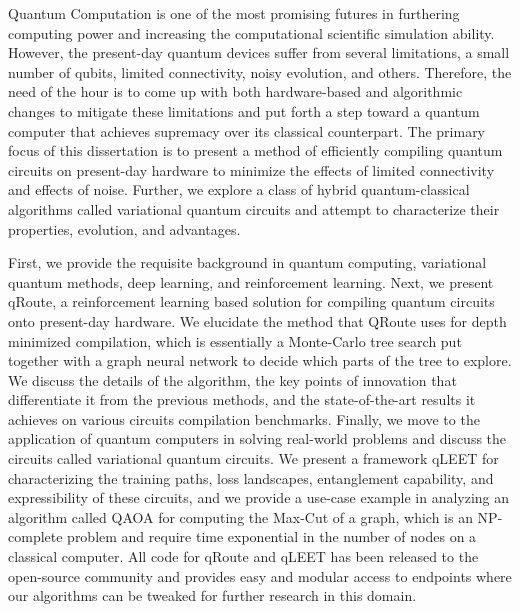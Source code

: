 Quantum Computation is one of the most promising futures in furthering computing power and increasing the computational scientific simulation ability. However, the present-day quantum devices suffer from several limitations, a small number of qubits, limited connectivity, noisy evolution, and others. Therefore, the need of the hour is to come up with both hardware-based and algorithmic changes to mitigate these limitations and put forth a step toward a quantum computer that achieves supremacy over its classical counterpart. The primary focus of this dissertation is to present a method of efficiently compiling quantum circuits on present-day hardware to minimize the effects of limited connectivity and effects of noise. Further, we explore a class of hybrid quantum-classical algorithms called variational quantum circuits and attempt to characterize their properties, evolution, and advantages. 

First, we provide the requisite background in quantum computing, variational quantum methods, deep learning, and reinforcement learning. Next, we present qRoute, a reinforcement learning based solution for compiling quantum circuits onto present-day hardware. We elucidate the method that QRoute uses for depth minimized compilation, which is essentially a Monte-Carlo tree search put together with a graph neural network to decide which parts of the tree to explore. We discuss the details of the algorithm, the key points of innovation that differentiate it from the previous methods, and the state-of-the-art results it achieves on various circuits compilation benchmarks. Finally, we move to the application of quantum computers in solving real-world problems and discuss the circuits called variational quantum circuits. We present a framework qLEET for characterizing the training paths, loss landscapes, entanglement capability, and expressibility of these circuits, and we provide a use-case example in analyzing an algorithm called QAOA for computing the Max-Cut of a graph, which is an NP-complete problem and require time exponential in the number of nodes on a classical computer. All code for qRoute and qLEET has been released to the open-source community and provides easy and modular access to endpoints where our algorithms can be tweaked for further research in this domain.
